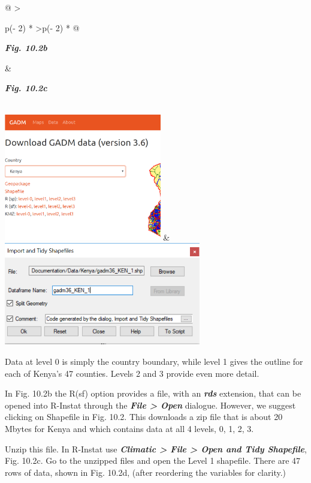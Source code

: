 \documentclass[
  letterpaper,
  DIV=11,
  numbers=noendperiod]{scrreprt}
\begin{document}
\begin{longtable}[]{@{}
  >{\raggedright\arraybackslash}p{(\columnwidth - 2\tabcolsep) * }
  >{\centering\arraybackslash}p{(\columnwidth - 2\tabcolsep) * }@{}}
\toprule\noalign{}
\begin{minipage}[b]{\linewidth}\raggedright
\textbf{\emph{Fig. 10.2b}}
\end{minipage} & \begin{minipage}[b]{\linewidth}\centering
\textbf{\emph{Fig. 10.2c}}
\end{minipage} \\
\midrule\noalign{}
\endhead
\bottomrule\noalign{}
\endlastfoot
\includegraphics[width=2.70509in,height=2.18312in]{figures/Fig10.2b.png}
&
\includegraphics[width=3.38928in,height=1.76785in]{figures/Fig10.2c.png} \\
\end{longtable}

Data at level 0 is simply the country boundary, while level 1 gives the
outline for each of Kenya's 47 counties. Levels 2 and 3 provide even
more detail.

In Fig. 10.2b the R(sf) option provides a file, with an
\textbf{\emph{rds}} extension, that can be opened into R-Instat through
the \textbf{\emph{File \textgreater{} Open}} dialogue. However, we
suggest clicking on Shapefile in Fig. 10.2. This downloads a zip file
that is about 20 Mbytes for Kenya and which contains data at all 4
levels, 0, 1, 2, 3.

Unzip this file. In R-Instat use \textbf{\emph{Climatic \textgreater{}
File \textgreater{} Open and Tidy Shapefile}}, Fig. 10.2c. Go to the
unzipped files and open the Level 1 shapefile. There are 47 rows of
data, shown in Fig. 10.2d, (after reordering the variables for clarity.)
\end{document}
